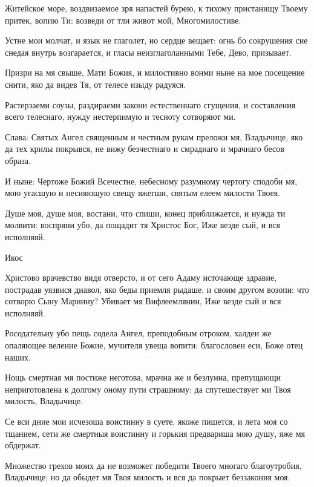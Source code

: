 \begin{mymulticols}


 Житейское море, воздвизаемое зря напастей бурею, к тихому пристанищу Твоему притек, вопию Ти: возведи от тли живот мой, Многомилостиве. 

Устне мои молчат, и язык не глаголет, но сердце вещает: огнь бо сокрушения сие снедая внутрь возгарается, и гласы неизглаголанными Тебе, Дево, призывает. 

Призри на мя свыше, Мати Божия, и милостивно вонми ныне на мое посещение снити, яко да видев Тя, от телесе изыду радуяся. 

Растерзаеми соузы, раздираеми закони естественнаго сгущения, и составления всего телеснаго, нужду нестерпимую и тесноту сотворяют ми. 

Слава: Святых Ангел священным и честным рукам преложи мя, Владычице, яко да тех крилы покрывся, не вижу безчестнаго и смраднаго и мрачнаго бесов образа. 

И ныне: Чертоже Божий Всечестне, небесному разумному чертогу сподоби мя, мою угасшую и несияющую свещу вжегши, святым елеем милости Твоея.




Душе моя, душе моя, востани, что спиши, конец приближается, и нужда ти молвити: воспряни убо, да пощадит тя Христос Бог, Иже везде сый, и вся исполняяй. 

Икос 

Христово врачевство видя отверсто, и от сего Адаму источающе здравие, пострадав уязвися диавол, яко беды приемля рыдаше, и своим другом возопи: что сотворю Сыну Мариину? Убивает мя Вифлеемлянин, Иже везде сый и вся исполняяй.




 Росодательну убо пещь содела Ангел, преподобным отроком, халдеи же опаляющее веление Божие, мучителя увеща вопити: благословен еси, Боже отец наших. 

Нощь смертная мя постиже неготова, мрачна же и безлунна, препущающи неприготовлена к долгому оному пути страшному: да спутешествует ми Твоя милость, Владычице. 

Се вси дние мои исчезоша воистинну в суете, якоже пишется, и лета моя со тщанием, сети же смертныя воистинну и горькия предвариша мою душу, яже мя обдержат. 

Множество грехов моих да не возможет победити Твоего многаго благоутробия, Владычице; но да обыдет мя Твоя милость и вся да покрыет беззакония моя. 


\end{mymulticols}
